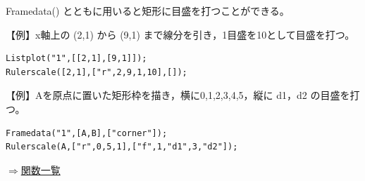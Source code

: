 \documentclass[papersize,a4paper,10pt,uplatex]{jsarticle}
\begin{document}
\begin{description}
Framedata() とともに用いると矩形に目盛を打つことができる。

\vspace{\baselineskip}
【例】x軸上の (2,1) から (9,1) まで線分を引き，1目盛を10として目盛を打つ。
\begin{verbatim}
Listplot("1",[[2,1],[9,1]]);
Rulerscale([2,1],["r",2,9,1,10],[]);
\end{verbatim}
\vspace{\baselineskip}
\begin{center} \scalebox{0.9}{} \end{center}
\vspace{\baselineskip}

【例】Aを原点に置いた矩形枠を描き，横に0,1,2,3,4,5，縦に d1，d2 の目盛を打つ。
\begin{verbatim}
Framedata("1",[A,B],["corner"]);
Rulerscale(A,["r",0,5,1],["f",1,"d1",3,"d2"]);
\end{verbatim}
\begin{center}\scalebox{0.9}{ } \end{center}
\begin{flushright}\hyperlink{functionlist}{$\Rightarrow$関数一覧}\end{flushright}

\end{description}

\end{document}
